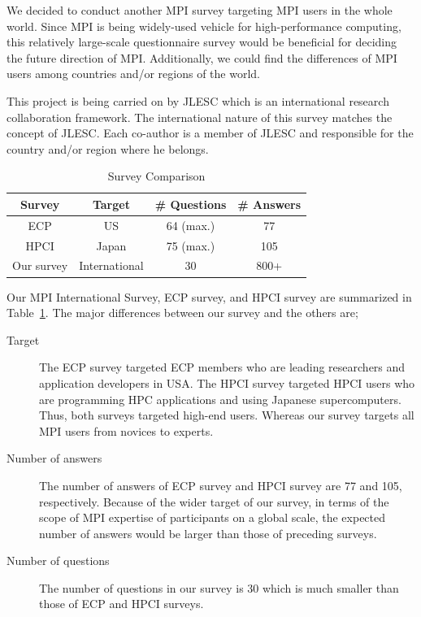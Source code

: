 \documentclass[submit,techrep,noauthor,english]{ipsj}
\begin{document}
We decided to conduct another MPI survey targeting MPI users in the
whole world. Since MPI is being widely-used vehicle for
high-performance computing, this relatively large-scale questionnaire 
survey would be beneficial for deciding the future direction of MPI.  
Additionally, we could find the differences of MPI users among
countries and/or regions of the world.  

This project is being carried on by JLESC\cite{JLESC} which is an
international research collaboration framework. The international
nature of this survey matches the concept of JLESC. Each co-author is
a member of JLESC and responsible for the country and/or
region where he belongs. 

\begin{table}[htb]%
\begin{center}%
\caption{Survey Comparison}\label{tab:comparison}%
\begin{tabular}{c|ccc}%
\hline%
Survey & Target & \# Questions & \# Answers \\%
\hline%
ECP  & US & 64 (max.) & 77 \\
HPCI & Japan & 75 (max.) & 105 \\
\hline
Our survey & International & 30 & 800+ \\
\hline%
\end{tabular}%
\end{center}%
\end{table}%

Our MPI International Survey, ECP survey, and HPCI survey are
summarized in Table~\ref{tab:comparison}. The major differences
between our survey and the others are;

\begin{description}
\item[Target]
  The ECP survey targeted ECP members who are leading researchers and
  application developers in USA. The HPCI survey targeted HPCI users
  who are programming HPC applications and using Japanese
  supercomputers. Thus, both surveys targeted high-end users. Whereas
  our survey targets all MPI users from novices to experts.
\item[Number of answers]
  The number of answers of ECP survey and HPCI survey are 77 and 105,
  respectively. Because of the wider target of our survey, in terms of
  the scope of MPI expertise of participants on a global scale, the
  expected number of answers would be larger than those of preceding
  surveys. 
\item[Number of questions]
  The number of questions in our survey is 30 which is much
  smaller than those of ECP and HPCI surveys. 
\end{description}
\end{document}
